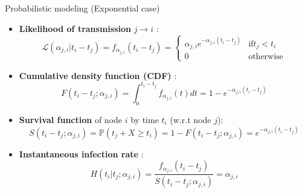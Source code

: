 \documentclass{beamer}
\begin{document}
\begin{frame}{Probabilistic modeling (Exponential case)}
\begin{itemize}
    \item \textbf{Likelihood of transmission} $j\rightarrow i$ : %
    \begin{equation}
    \mathscr{L}(\alpha_{j,i}|t_i-t_j) = f_{\alpha_{j,i}}(t_i-t_j) = \begin{cases}
    \alpha_{j,i} e^{-\alpha_{j,i}(t_i-t_j)}     &  \text{if} t_j < t_i\\
    0    & \text{otherwise}
    \end{cases}
\end{equation}
\item \textbf{Cumulative density function (CDF)} :
\begin{equation}
    F(t_i-t_j;\alpha_{j,i}) = \int_{0}^{t_i-t_j}f_{\alpha_{j,i}}(t)dt = 1-e^{-\alpha_{j,i}(t_i-t_j)}
\end{equation}
\item \textbf{Survival function} of node $i$ by time $t_i$ (w.r.t node $j$):
\begin{equation}
    S(t_i-t_j;\alpha_{j,i})=\mathds{P}(t_j + X \geq t_i) = 1-F(t_i-t_j;\alpha_{j,i}) = e^{-\alpha_{j,i}(t_i-t_j)}
\end{equation}
\item \textbf{Instantaneous infection rate} :
\begin{equation}
    H(t_i|t_j;\alpha_{j,i}) = \frac{f_{\alpha_{j,i}}(t_i-t_j)}{S(t_i-t_j;\alpha_{j,i})} = \alpha_{j,i}
\end{equation}
\end{itemize}
\end{frame}
\end{document}
